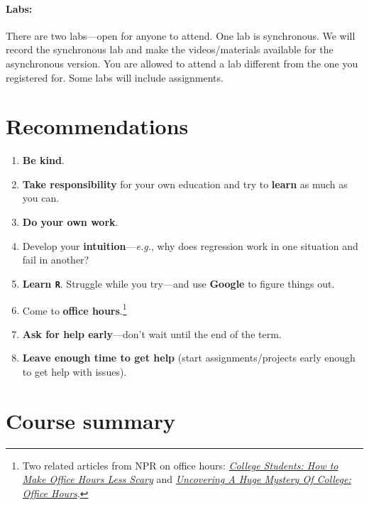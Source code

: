 \documentclass[10pt]{article}
\begin{document}
\paragraph{Labs:} There are two labs---open for anyone to attend. One lab is synchronous. We will record the synchronous lab and make the videos/materials available for the asynchronous version. You are allowed to attend a lab different from the one you registered for. Some labs will include assignments.

\section*{Recommendations}

\begin{enumerate}
  \item \textbf{Be kind}.
  \item \textbf{Take responsibility} for your own education and try to \textbf{learn} as much as you can.
  \item \textbf{Do your own work}.
  \item Develop your \textbf{intuition}---\textit{e.g.}, why does regression work in one situation and fail in another?
  \item \textbf{Learn \texttt{R}}. Struggle while you try---and use \textbf{Google} to figure things out.
  \item Come to \textbf{office hours}.\footnote{Two related articles from NPR on office hours: \href{https://www.npr.org/2019/10/05/678815966/college-students-how-to-make-office-hours-less-scary}{\textit{College Students: How to Make Office Hours Less Scary}} and \href{https://www.npr.org/2019/10/02/766568824/uncovering-a-huge-mystery-of-college-office-hours}{\textit{Uncovering A Huge Mystery Of College: Office Hours}}.}
  \item \textbf{Ask for help early}---don't wait until the end of the term.
  \item \textbf{Leave enough time to get help} (start assignments/projects early enough to get help with issues).
\end{enumerate}

\section*{Course summary}
\end{document}
